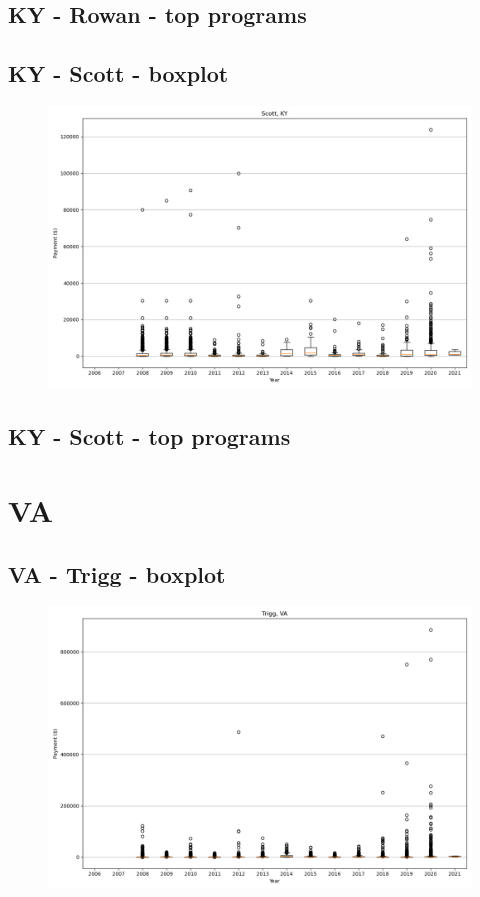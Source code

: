 \subsection*{KY - Rowan - top programs}

\newpage
\subsection*{KY - Scott - boxplot}
\begin{figure}[h]
\centering
\includegraphics[width=7in]{../output/boxplots/counties/Scott-KY_boxplot.png}
\end{figure}


\subsection*{KY - Scott - top programs}

\newpage
\section*{VA}
\subsection*{VA - Trigg - boxplot}
\begin{figure}[h]
\centering
\includegraphics[width=7in]{../output/boxplots/counties/Trigg-VA_boxplot.png}
\end{figure}


